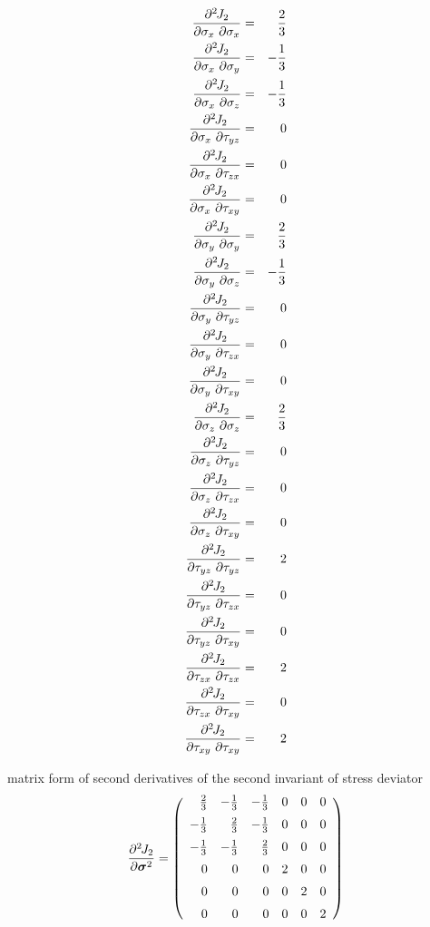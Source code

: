 \begin{eqnarray}
\dpd{J_2}{\sigma_x}{\sigma_x} &=& \del{2}{3}
\\
\dpd{J_2}{\sigma_x}{\sigma_y} &=& -\del{1}{3}
\\
\dpd{J_2}{\sigma_x}{\sigma_z} &=& -\del{1}{3}
\\
\dpd{J_2}{\sigma_x}{\tau_{yz}} &=& 0
\\
\dpd{J_2}{\sigma_x}{\tau_{zx}} &=& 0
\\
\dpd{J_2}{\sigma_x}{\tau_{xy}} &=& 0
\\
\dpd{J_2}{\sigma_y}{\sigma_y} &=& \del{2}{3}
\\
\dpd{J_2}{\sigma_y}{\sigma_z} &=& -\del{1}{3}
\\
\dpd{J_2}{\sigma_y}{\tau_{yz}} &=& 0
\\
\dpd{J_2}{\sigma_y}{\tau_{zx}} &=& 0
\\
\dpd{J_2}{\sigma_y}{\tau_{xy}} &=& 0
\\
\dpd{J_2}{\sigma_z}{\sigma_z} &=& \del{2}{3}
\\
\dpd{J_2}{\sigma_z}{\tau_{yz}} &=& 0
\\
\dpd{J_2}{\sigma_z}{\tau_{zx}} &=& 0
\\
\dpd{J_2}{\sigma_z}{\tau_{xy}} &=& 0
\\
\dpd{J_2}{\tau_{yz}}{\tau_{yz}} &=& 2
\\
\dpd{J_2}{\tau_{yz}}{\tau_{zx}} &=& 0
\\
\dpd{J_2}{\tau_{yz}}{\tau_{xy}} &=& 0
\\
\dpd{J_2}{\tau_{zx}}{\tau_{zx}} &=& 2
\\
\dpd{J_2}{\tau_{zx}}{\tau_{xy}} &=& 0
\\
\dpd{J_2}{\tau_{xy}}{\tau_{xy}} &=& 2
\end{eqnarray}

matrix form of second derivatives of the second invariant of stress deviator
\begin{eqnarray}
\mbox{$\displaystyle\frac{\partial^{2}\>\!\!{J_2}}{\partial{\mbox{\boldmath$\sigma$}}^{2}}$} = \left(\begin{array}{rrrrrr}
 \frac{2}{3} & -\frac{1}{3} & -\frac{1}{3} & 0 & 0 & 0
\\[2mm]
-\frac{1}{3} &  \frac{2}{3} & -\frac{1}{3} & 0 & 0 & 0
\\[2mm]
-\frac{1}{3} & -\frac{1}{3} &  \frac{2}{3} & 0 & 0 & 0
\\[2mm]
          0  &           0  &           0  & 2 & 0 & 0
\\[2mm]
          0  &           0  &           0  & 0 & 2 & 0
\\[2mm]
          0  &           0  &           0  & 0 & 0 & 2
\end{array}\right)
\end{eqnarray}

